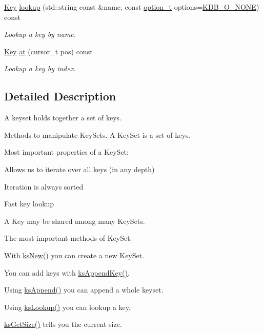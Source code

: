\begin{DoxyCompactItemize}
\hyperlink{classkdb_1_1Key}{Key} \hyperlink{classkdb_1_1KeySet_a2bb4b6f5c46eb54c4f495832672e1e98}{lookup} (std\-::string const \&name, const \hyperlink{group__keyset_ga98a3d6a4016c9dad9cbd1a99a9c2a45a}{option\-\_\-t} options=\hyperlink{group__keyset_gga98a3d6a4016c9dad9cbd1a99a9c2a45aa00738455e0ae843c8720809d8287f370}{K\-D\-B\-\_\-\-O\-\_\-\-N\-O\-N\-E}) const 
\begin{DoxyCompactList}\small\item\em Lookup a key by name. \end{DoxyCompactList}\item 
\hyperlink{classkdb_1_1Key}{Key} \hyperlink{classkdb_1_1KeySet_ad4aa72767cf702066e804ef054fc7e5b}{at} (cursor\-\_\-t pos) const 
\begin{DoxyCompactList}\small\item\em Lookup a key by index. \end{DoxyCompactList}\end{DoxyCompactItemize}


\subsection{Detailed Description}
A keyset holds together a set of keys. 

Methods to manipulate Key\-Sets.  A Key\-Set is a set of keys.

Most important properties of a Key\-Set\-:


\begin{DoxyItemize}
\item Allows us to iterate over all keys (in any depth)
\item Iteration is always sorted
\item Fast key lookup
\item A Key may be shared among many Key\-Sets.
\end{DoxyItemize}

The most important methods of Key\-Set\-:


\begin{DoxyItemize}
\item With \hyperlink{group__keyset_ga671e1aaee3ae9dc13b4834a4ddbd2c3c}{ks\-New()} you can create a new Key\-Set.
\item You can add keys with \hyperlink{group__keyset_gaa5a1d467a4d71041edce68ea7748ce45}{ks\-Append\-Key()}.
\item Using \hyperlink{group__keyset_ga21eb9c3a14a604ee3a8bdc779232e7b7}{ks\-Append()} you can append a whole keyset.
\item Using \hyperlink{group__keyset_gaa34fc43a081e6b01e4120daa6c112004}{ks\-Lookup()} you can lookup a key.
\item \hyperlink{group__keyset_ga7474ad6b0a0fa969dbdf267ba5770eee}{ks\-Get\-Size()} tells you the current size.
\end{DoxyItemize}

